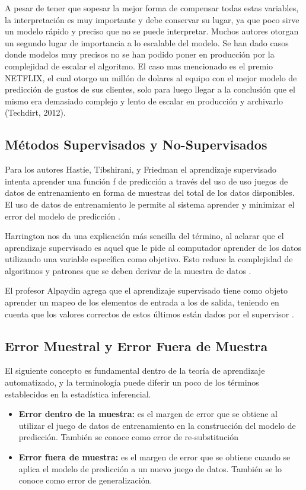 \documentclass[letterpaper, spanish, 11pt]{report}
\begin{document}
A pesar de tener que sopesar la mejor forma de compensar todas estas variables, la interpretación es muy importante y debe conservar su lugar, ya que poco sirve un modelo rápido y preciso que no se puede interpretar. Muchos autores otorgan un segundo lugar de importancia a lo escalable del modelo. Se han dado casos donde modelos muy precisos no se han podido poner en producción por la complejidad de escalar el algoritmo. El caso mas mencionado es el premio NETFLIX, el cual otorgo un millón de dolares al equipo con el mejor modelo de predicción de gustos de sus clientes, solo para luego llegar a la conclusión que el mismo era demasiado complejo y lento de escalar en producción y archivarlo (Techdirt, 2012).

\subsection{Métodos Supervisados y No-Supervisados}
Para los autores Hastie, Tibshirani, y Friedman el aprendizaje supervisado intenta aprender una función f de predicción a través del uso de uso juegos de datos de entrenamiento en forma de muestras del total de los datos disponibles. El uso de datos de entrenamiento le permite al sistema aprender y minimizar el error del modelo de predicción \cite{theElements}.  

Harrington nos da una explicación más sencilla del término, al aclarar que el aprendizaje supervisado es aquel que le pide al computador aprender de los datos utilizando una variable específica como objetivo. Esto reduce la complejidad de algoritmos y patrones que se deben derivar de la muestra de datos \cite{harrington}. 

El profesor Alpaydin agrega que el aprendizaje supervisado tiene como objeto aprender un mapeo de los elementos de entrada a los de salida, teniendo en cuenta que los valores correctos de estos últimos están dados por el supervisor \cite{alpaydin}.

\subsection{Error Muestral y Error Fuera de Muestra}
El siguiente concepto es fundamental dentro de la teoría de aprendizaje automatizado, y la terminología puede diferir un poco de los términos establecidos en la estadística inferencial.

	\begin{itemize}
		\item \textbf{Error dentro de la muestra:} es el margen de error que se obtiene al utilizar el juego de datos de entrenamiento en la construcción del modelo de predicción. También se conoce como error de re-substitución 
		\item  \textbf{Error fuera de muestra:} es el margen de error que se obtiene cuando se aplica el modelo de predicción a un nuevo juego de datos. También se lo conoce como error de generalización. 
	\end{itemize}
\end{document}
